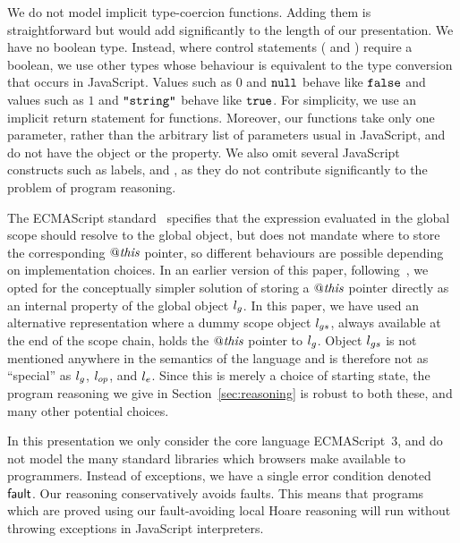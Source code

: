 \documentclass{article}
\begin{document}
We do not model implicit type-coercion functions. Adding them is
straightforward but would add significantly to the length of our
presentation.
%
We have no boolean type. 
Instead, where control statements ( and ) require a
boolean, we use other types whose behaviour is  equivalent to the type
conversion that occurs in JavaScript. Values such as $0$ and $\mbox{\texttt{{\upshape null}}}$
behave like $\mbox{\texttt{{\upshape false}}}$ and values such as $1$ and $\mbox{\texttt{{\upshape "string"}}}$
behave like $\mbox{\texttt{{\upshape true}}}$.
%
%
%
%
For simplicity, we use an implicit return statement for functions.
%
Moreover, our functions take only one parameter, rather than the arbitrary list of parameters usual in  JavaScript, and do not have the  object or the  property.
%
%
%
%
We also  omit several JavaScript constructs such as labels,  and , as they do not contribute significantly to the problem of program  reasoning. 

The ECMAScript standard~\cite{ecma262} specifies that the expression  evaluated in the global scope should resolve to the global object, but does not mandate where to store the corresponding $\mathit{@this}$ pointer, so different behaviours are possible depending on implementation choices.
%
In an earlier version of this paper, following~\cite{MMT-APLAS-TR08}, we opted for the conceptually simpler solution of storing a $\mathit{@this}$ pointer directly as an internal property of the global object $l_g$.
% 
In this paper, we have used an alternative representation where a dummy scope object $l_{gs}$, always available at the end of the scope chain, holds the $\mathit{@this}$ pointer to $l_g$. Object $l_{gs}$
is not mentioned anywhere in the semantics of the language and is
therefore not as ``special'' as $l_g$, $l_{op}$, and $l_{e}$. 
Since this is merely a
choice of starting state, the program reasoning we give in
Section~\ref{sec:reasoning} is robust to both these, and many other
potential choices.

In this presentation we only consider the core language ECMAScript~3,
and do not model the many standard libraries which browsers make
available to programmers. 
%
%
Instead of exceptions, we have a single error condition denoted ${\mathsf{fault}}$.
%
Our reasoning conservatively avoids faults.
%
This means that programs which are proved using our fault-avoiding local Hoare reasoning will run without throwing exceptions in JavaScript interpreters. 
\end{document}
